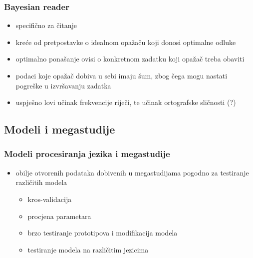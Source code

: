 \documentclass{beamer}
\begin{document}
\begin{frame}
    \frametitle{Bayesian reader \citep{norrisBayesianReaderExplaining2006}}

    \begin{itemize}
        \item specifično za čitanje

        \pause

        \item kreće od pretpostavke o idealnom opažaču koji donosi optimalne
            odluke

        \pause

        \item optimalno ponašanje ovisi o konkretnom zadatku koji opažač treba
            obaviti

        \item podaci koje opažač dobiva u sebi imaju šum, zbog čega mogu nastati
            pogreške u izvršavanju zadatka

        \pause

        \item uspješno lovi učinak frekvencije riječi, te učinak ortografske
            sličnosti (?)
    \end{itemize}
\end{frame}

\subsection{Modeli i megastudije}

\begin{frame}
    \frametitle{Modeli procesiranja jezika i megastudije}

    \begin{itemize}
        \item obilje otvorenih podataka dobivenih u megastudijama pogodno za
            testiranje različitih modela

            \begin{itemize}
                \item kros-validacija

                \item procjena parametara

                \item brzo testiranje prototipova i modifikacija modela

                \item testiranje modela na različitim jezicima
            \end{itemize}

    \end{itemize}
\end{frame}
\end{document}
